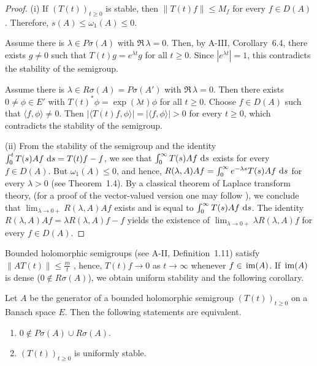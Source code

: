 \begin{proof} (i) If $ (T(t))_{t \geq 0} $ is stable, then $ \|T(t) f\| \leq M_f $ for every $ f \in D(A) $. Therefore, $ s(A) \leq \omega_1(A) \leq 0 $. 

Assume there is $ \lambda \in P\sigma(A) $ with $ \Re\,\lambda = 0 $. 
Then, by A-III, Corollary~6.4, there exists $ g \neq 0 $ such that $ T(t) g = e^{\lambda t} g $ for all $ t \geq 0 $. Since $ |e^{\lambda t}| = 1 $, this contradicts the stability of the semigroup. 

Assume there is $ \lambda \in R\sigma(A) = P\sigma(A') $ with $ \Re\,\lambda = 0 $. 
Then there exists $ 0 \neq \phi \in E' $ with $ T(t)^* \phi = \exp(\lambda t) \phi $ for all $ t \geq 0 $. Choose $ f \in D(A) $ such that $ \langle f, \phi \rangle \neq 0 $. 
Then $ |\langle T(t) f, \phi \rangle| = | \langle f, \phi \rangle| > 0 $ for every $ t \geq 0 $, which contradicts the stability of the semigroup.

(ii) From the stability of the semigroup and the identity   $\int_{0}^{t} T(s) A f \,\mathop{}\!\mathrm{d}{s} = T(t) f - f$, we see that  
$\int_{0}^{\infty} T(s) A f \,\mathop{}\!\mathrm{d}{s}$ exists for every $ f \in D(A) $.  
But $ \omega_1(A) \leq 0 $, and hence,  
$ R(\lambda, A) A f = \int_{0}^{\infty} e^{-\lambda s} T(s) A f \,\mathop{}\!\mathrm{d}{s} $ for every $ \lambda > 0 $ (see Theorem~1.4). 
By a classical theorem of Laplace transform theory, (for a proof of the vector-valued version one may follow \citet[p.196]{widder:1971}), we conclude that $\lim_{\lambda \to 0+} R(\lambda,A)Af$ exists
and is equal to $\int_{0}^{\infty} T(s)Af \,\mathop{}\!\mathrm{d}{s}$. 
The identity $R(\lambda,A)Af = \lambda R(\lambda,A)f - f$
yields the existence of $\lim_{\lambda \to 0+} \lambda R(\lambda,A)f$ for every $f \in D(A)$.
\end{proof}
Bounded holomorphic semigroups (see A-II, Definition~1.11) satisfy
$\|AT(t)\| \leq \frac{m}{t}$ \citet[p.33]{goldstein:1985a}, hence, $T(t)f \to 0$ as $t \to \infty$
whenever $f \in \mathop{}\mathrm{im}(A)$. 
If $\mathop{}\mathrm{im}(A)$ is dense (\ie $0 \not\in R\sigma(A)$), we obtain
uniform stability and the following corollary.
\begin{corollary}\label{cor:a4-1.14}
Let $A$ be the generator of a bounded holomorphic
semigroup $(T(t))_{t \geq 0}$ on a Banach space $E$. 
Then the following statements are equivalent.
\begin{enumerate}[\upshape (a)]
\item 
$0 \not\in P\sigma(A) \cup R\sigma(A)$.

\item 
$(T(t))_{t \geq 0}$ is uniformly stable.

\end{enumerate}
\end{corollary}

